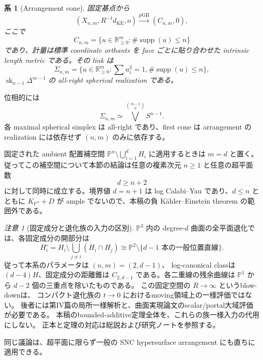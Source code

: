 \documentclass[11pt,a4paper]{ltjsarticle}
\newcommand{\PP}{\mathbb P}
\newcommand{\RR}{\mathbb R}
\newcommand{\supp}{\operatorname{supp}}
\newcommand{\pGH}{\operatorname{pGH}}
\newcommand{\sk}{\operatorname{sk}}
\theoremstyle{plain}
\newtheorem{corollary}[corollary]{系}
\theoremstyle{definition}
\theoremstyle{remark}
\newtheorem{remark}[remark]{注意}
\begin{document}
\begin{corollary}[Arrangement cone]
\label{cor:arrangement-cone}
固定基点から
\[
 (X_{n,m},R^{-1}d_{\mathrm{KE}},o)
 \xrightarrow{\pGH}(C_{n,m},0),
\]
ここで
\[
 \boxed{
 C_{n,m}=\{u\in\RR_{\ge0}^m:\#\supp(u)\le n\}}
\]
であり、計量は標準 coordinate orthants を face ごとに貼り合わせた intrinsic length metric である。その link は
\[
 \Sigma_{n,m}=\{u\in\RR_{\ge0}^m:\sum u_i^2=1,\#\supp(u)\le n\},
\]
$\sk_{n-1}\Delta^{m-1}$ の all-right spherical realization である。
\end{corollary}

位相的には
\[
 \Sigma_{n,m}\simeq\bigvee^{\binom{m-1}{n}}S^{n-1}.
\]
各 maximal spherical simplex は all-right であり、first cone は arrangement の realization には依存せず $(n,m)$ のみに依存する。

固定された ambient 配置補空間 $\PP^n\setminus\bigcup_{i=1}^dH_i$ に適用するときは $m=d$ と置く。従ってこの補空間について本節の結論は任意の複素次元 $n\ge1$ と任意の超平面数
\[
 d\ge n+2
\]
に対して同時に成立する。境界値 $d=n+1$ は log Calabi--Yau であり、$d\le n$ とともに $K_{\PP^n}+D$ が ample でないので、本稿の負 K\"ahler--Einstein theorem の範囲外である。


\begin{remark}[固定成分と退化族の入力の区別]
\label{rem:fixed-family-interface}
$\PP^3$ 内の degree-$d$ 曲面の全平面退化では、各固定成分の開部分は
\[
 H_i^\circ
 =H_i\setminus\bigcup_{j\ne i}(H_i\cap H_j)
 \cong\PP^2\setminus\{d-1\text{ 本の一般位置直線}\}.
\]
従って本系のパラメータは $(n,m)=(2,d-1)$、
log-canonical classは $(d-4)H$、固定成分の距離錐は
$C_{2,d-1}$ である。各二重線の残余曲線は
$\PP^1$ から $d-2$ 個の三重点を除いたものである。
この固定空間の $R\to\infty$ というblow-downは、
コンパクト退化族の $t\to0$ におけるmoving領域上の一様評価ではない。
後者には第IV篇の局所一様解析と、曲面実現論文のscalar/portal大域評価が必要である。
本稿のbounded-additive定理全体を、これらの族一様入力の代用にしない。
正本と定理の対応は総説および研究ノートを参照する。
\end{remark}

同じ議論は、超平面に限らず一般の SNC hypersurface arrangement にも直ちに適用できる。
\end{document}
